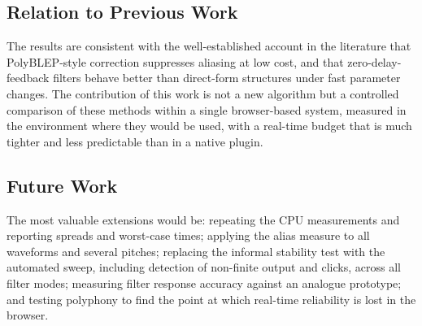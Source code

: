 \subsection{Relation to Previous Work}
\noindent
The results are consistent with the well-established account in the literature that PolyBLEP-style correction suppresses aliasing at low cost\cite{PolyBLEP}, and that zero-delay-feedback filters behave better than direct-form structures under fast parameter changes\cite{va_filter}. The contribution of this work is not a new algorithm but a controlled comparison of these methods within a single browser-based system, measured in the environment where they would be used, with a real-time budget that is much tighter and less predictable than in a native plugin.

\subsection{Future Work}
\noindent
The most valuable extensions would be: repeating the CPU measurements and reporting spreads and worst-case times; applying the alias measure to all waveforms and several pitches; replacing the informal stability test with the automated sweep, including detection of non-finite output and clicks, across all filter modes; measuring filter response accuracy against an analogue prototype; and testing polyphony to find the point at which real-time reliability is lost in the browser.